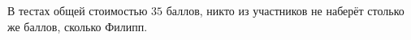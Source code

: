 В тестах общей стоимостью $35$ баллов, никто из участников не наберёт столько же баллов, сколько Филипп.
